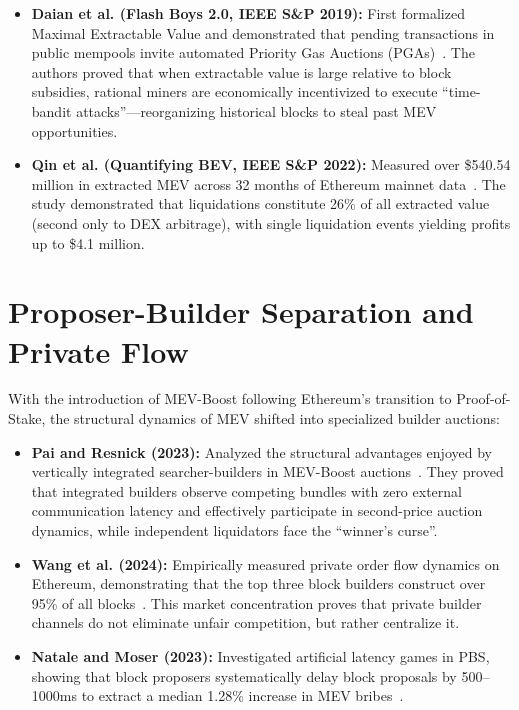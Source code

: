 \begin{itemize}
    \item \textbf{Daian et al. (Flash Boys 2.0, IEEE S\&P 2019):} First formalized Maximal Extractable Value and demonstrated that pending transactions in public mempools invite automated Priority Gas Auctions (PGAs)~\cite{daian2019flashboys}. The authors proved that when extractable value is large relative to block subsidies, rational miners are economically incentivized to execute ``time-bandit attacks''---reorganizing historical blocks to steal past MEV opportunities.
    
    \item \textbf{Qin et al. (Quantifying BEV, IEEE S\&P 2022):} Measured over \$540.54 million in extracted MEV across 32 months of Ethereum mainnet data~\cite{qin2022quantifying}. The study demonstrated that liquidations constitute 26\% of all extracted value (second only to DEX arbitrage), with single liquidation events yielding profits up to \$4.1 million.
\end{itemize}

\section{Proposer-Builder Separation and Private Flow}
With the introduction of MEV-Boost following Ethereum's transition to Proof-of-Stake, the structural dynamics of MEV shifted into specialized builder auctions:

\begin{itemize}
    \item \textbf{Pai and Resnick (2023):} Analyzed the structural advantages enjoyed by vertically integrated searcher-builders in MEV-Boost auctions~\cite{pai2023integrated}. They proved that integrated builders observe competing bundles with zero external communication latency and effectively participate in second-price auction dynamics, while independent liquidators face the ``winner's curse''.
    
    \item \textbf{Wang et al. (2024):} Empirically measured private order flow dynamics on Ethereum, demonstrating that the top three block builders construct over 95\% of all blocks~\cite{wang2024private}. This market concentration proves that private builder channels do not eliminate unfair competition, but rather centralize it.
    
    \item \textbf{Natale and Moser (2023):} Investigated artificial latency games in PBS, showing that block proposers systematically delay block proposals by 500--1000ms to extract a median 1.28\% increase in MEV bribes~\cite{natale2023artificial}.
\end{itemize}

